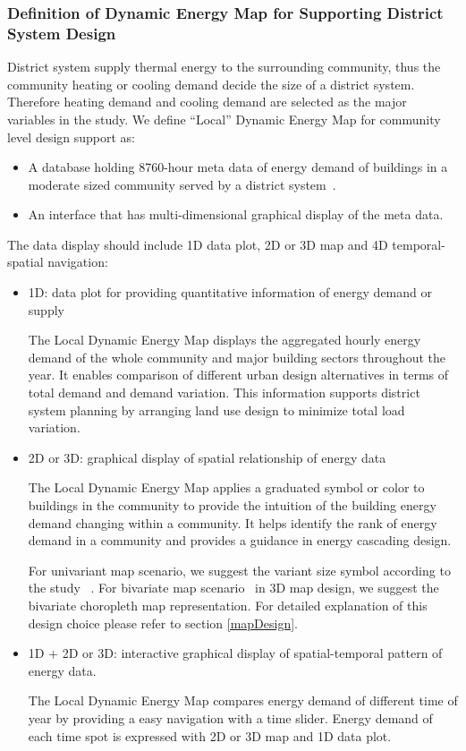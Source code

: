 \documentclass[hidelinks,12pt]{article}
\begin{document}
\subsubsection{Definition of Dynamic Energy Map for Supporting
  District System Design}
District system supply thermal energy to the surrounding community,
thus the community heating or cooling demand decide the size of a
district system. Therefore heating demand and cooling demand are
selected as the major variables in the study. We define ``Local''
Dynamic Energy Map for community level design support as:
\begin{itemize}
\item A database holding 8760-hour meta data of energy demand of
  buildings in a moderate sized community served by a district
  system~\cite{baird2014}.
\item An interface that has multi-dimensional graphical display of the
  meta data.
\end{itemize}

The data display should include 1D data plot, 2D or 3D map and 4D
temporal-spatial navigation:
\begin{itemize}
\item 1D: data plot for providing quantitative information of energy
  demand or supply

  The Local Dynamic Energy Map displays the aggregated hourly energy
  demand of the whole community and major building sectors throughout
  the year. It enables comparison of different urban design
  alternatives in terms of total demand and demand variation. This
  information supports district system planning by arranging land use
  design to minimize total load variation.

\item 2D or 3D: graphical display of spatial relationship of energy
  data

  The Local Dynamic Energy Map applies a graduated symbol or color to
  buildings in the community to provide the intuition of the building
  energy demand changing within a community. It helps identify the
  rank of energy demand in a community and provides a guidance in
  energy cascading design.
    
  For univariant map scenario, we suggest the variant size symbol
  according to the study ~\cite{Garlandini2009,
    doi:10.1559/1523040639298}. For bivariate map
  scenario~\cite{bimapWiki} in 3D map design, we suggest the bivariate
  choropleth map representation. For detailed explanation of this
  design choice please refer to section \ref{mapDesign}.

\item 1D + 2D or 3D: interactive graphical display of spatial-temporal
  pattern of energy data.
  
  The Local Dynamic Energy Map compares energy demand of different
  time of year by providing a easy navigation with a time
  slider. Energy demand of each time spot is expressed with 2D or 3D
  map and 1D data plot.
\end{itemize}
\end{document}
